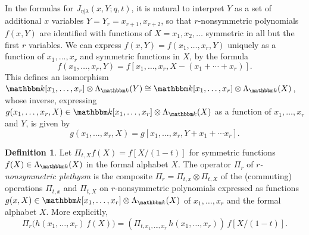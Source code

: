 \documentclass[12pt]{amsart}
\theoremstyle{definition}
\newtheorem{defn}[thm]{Definition}
\theoremstyle{remark}
\newcommand{\kk}{{\mathbbm k}}
\newcommand{\Pisf}{{\mathsf \Pi }}
\newcommand{\Jns}{J}           %
\begin{document}
In the formulas for $\Jns _{\eta |\lambda }(x,Y;q,t)$, it is natural
to interpret $Y$ as a set of additional $x$ variables $Y = Y_{r} =
x_{r+1}, x_{r+2}$, so that $r$-nonsymmetric polynomials $f(x,Y)$ are
identified with functions of $X = x_{1}, x_{2}, \ldots $ symmetric in
all but the first $r$ variables.
We can express $f(x,Y) = f(x_1,\dots, x_r, Y)$ uniquely as a function
of $x_1, \dots, x_r$ and symmetric functions in $X$, by the formula
\begin{equation}\label{e:change-Y-to-X}
f(x_1, \dots, x_r,Y)=f[x_1, \dots, x_r,X-(x_{1}+\cdots +x_{r})].
\end{equation}
This defines an isomorphism $\kk [x_{1},\ldots,x_{r}]\otimes \Lambda
_{\kk }(Y) \cong \kk [x_{1},\ldots,x_{r}]\otimes \Lambda _{\kk }(X)$,
whose inverse, expressing $g(x_1, \dots, x_r,X)\in \kk
[x_{1},\ldots,x_{r}]\otimes \Lambda _{\kk }(X)$ as a function of $x_1,
\dots, x_r$ and $Y$, is given by
\begin{equation}\label{e:change-X-to-Y}
g(x_1, \dots, x_r,X)=g[x_1, \dots, x_r,Y+x_{1}+\cdots x_{r}].
\end{equation}



\begin{defn}\label{def:Pir}
Let $\Pi _{t,X} f(X) = f[X/(1-t)]$ for symmetric functions $f(X)\in
\Lambda _{\kk }(X)$ in the formal alphabet $X$.  The operator $\Pisf
_{r}$ of {\em $r$-nonsymmetric plethysm} is the composite $\Pisf _{r}
= \Pi _{t,x}\otimes \Pi _{t,X}$ of the (commuting) operations $\Pi
_{t,x}$ and $\Pi _{t,X}$ on $r$-nonsymmetric polynomials expressed as
functions $g(x,X)\in \kk [x_{1},\ldots,x_{r}]\otimes \Lambda _{\kk
}(X)$ of $x_{1},\ldots,x_{r}$ and the formal alphabet $X$.  More
explicitly,
\begin{equation}\label{e:Pir}
\Pisf _{r} \bigl(h(x_{1},\ldots,x_{r})\, f(X)\bigr) = (\Pi
_{t,x_{1},\ldots,x_{r}}\, h(x_{1},\ldots,x_{r}))\, f[X/(1-t)].
\end{equation}
\end{defn}
\end{document}
